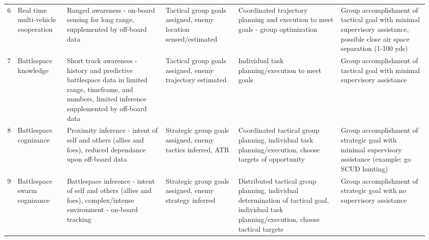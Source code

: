 \begin{table}
\begin{tabular}{r L{0.1\textwidth} L{0.175\textwidth} L{0.175\textwidth} L{0.175\textwidth} L{0.175\textwidth}}
        6   & Real time multi-vehicle cooperation           & Ranged awareness - on-board sensing for long range, supplemented by off-board data                                                                            & Tactical group goals assigned, enemy location sensed/estimated                                                                                                                                                                & Coordinated trajectory planning and execution to meet goals - group optimization                                                              & Group accomplishment of tactical goal with minimal supervisory assistance, possible close air space separation (1-100 yds) \\
        7   & Battlespace knowledge                         & Short track awareness - history and predictive battlespace data in limited range, timeframe, and numbers, limited inference supplemented by off-board data    & Tactical group goals assigned, enemy trajectory estimated                                                                                                                                                                     & Individual task planning/execution to meet goals                                                                                              & Group accomplishment of tactical goal with minimal supervisory assistance \\
        8   & Battlespace cognizance                        & Proximity inference - intent of self and others (allies and foes), reduced dependance upon off-board data                                                     & Strategic group goals assigned, enemy tactics inferred, ATR                                                                                                                                                                   & Coordinated tactical group planning, individual task planning/execution, choose targets of opportunity                                        & Group accomplishment of strategic goal with minimal supervisory assistance (example: go SCUD hunting) \\
        9   & Battlespace swarm cognizance                  & Battlespace inference - intent of self and others (allies and foes), complex/intense environment - on-board tracking                                          & Strategic group goals assigned, enemy strategy inferred                                                                                                                                                                       & Distributed tactical group planning, individual determination of tactical goal, individual task planning/execution, choose tactical targets   & Group accomplishment of strategic goal with no supervisory assistance \\

\end{tabular}
\end{table}
